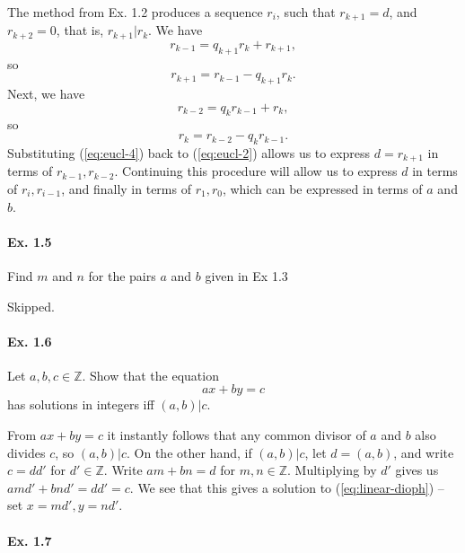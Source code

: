 \documentclass[notitlepage]{article}
\theoremstyle{definition}
\newcommand\Z{\mathbb{Z}}
\begin{document}
The method from Ex. 1.2 produces a sequence $r_i$, such that $r_{k+1}
= d$, and $r_{k+2} = 0$, that is, $r_{k+1} | r_k$. We have
\begin{equation}
  \label{eq:eucl-1}
  r_{k-1} = q_{k+1} r_{k} + r_{k+1},
\end{equation}
so
\begin{equation}
  \label{eq:eucl-2}
  r_{k+1} = r_{k-1} - q_{k+1} r_{k}.
\end{equation}
Next, we have
\begin{equation}
  \label{eq:eucl-3}
  r_{k-2} = q_{k} r_{k-1} + r_{k},
\end{equation}
so
\begin{equation}
  \label{eq:eucl-4}
  r_{k} = r_{k-2} - q_{k} r_{k-1}.
\end{equation}
Substituting (\ref{eq:eucl-4}) back to (\ref{eq:eucl-2}) allows us to
express $d = r_{k+1}$ in terms of $r_{k-1}, r_{k-2}$. Continuing this
procedure will allow us to express $d$ in terms of $r_i, r_{i-1}$, and
finally in terms of $r_1, r_0$, which can be expressed in terms of $a$
and $b$.

\paragraph{Ex. 1.5}

Find $m$ and $n$ for the pairs $a$ and $b$ given in Ex 1.3

Skipped.

\paragraph{Ex. 1.6}

Let $a, b, c \in \Z$. Show that the equation
\begin{equation}
  \label{eq:linear-dioph}
  ax + by = c
\end{equation}
has solutions in integers iff $(a, b) |c$.

From $ax + by = c$ it instantly follows that any common divisor of $a$
and $b$ also divides $c$, so $(a, b) | c$. On the other hand, if $(a,
b)|c$, let $d = (a, b)$, and write $c = dd'$ for $d' \in
\Z$. Write $am + bn = d$ for $m, n \in
\Z$. Multiplying by $d'$ gives us $amd' + bnd' = dd' = c$. We
see that this gives a solution to (\ref{eq:linear-dioph}) -- set $x =
md', y = nd'$.

\paragraph{Ex. 1.7}
\end{document}
